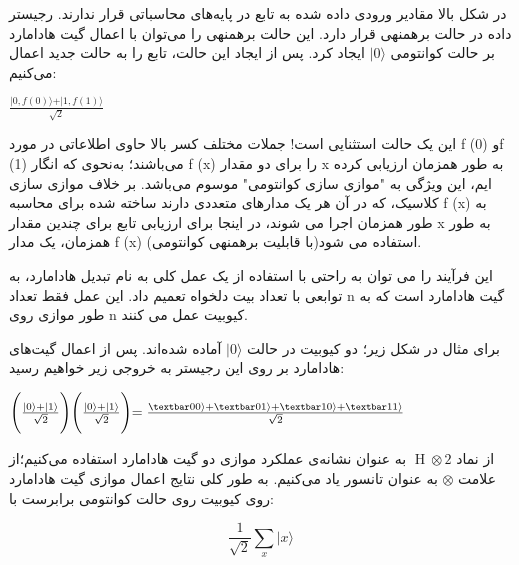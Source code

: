 \documentclass{book}
\begin{document}
در شکل بالا مقادیر ورودی داده شده به تابع  در پایه‌های محاسباتی قرار ندارند. رجیستر داده در حالت برهمنهی  قرار دارد. این حالت برهمنهی را می‌توان با اعمال گیت هادامارد بر حالت کوانتومی $\vert 0 \rangle$ ایجاد کرد. پس از ایجاد این حالت، تابع  را به حالت جدید اعمال می‌کنیم:
\begin{center}
	$\frac{\vert 0,f(0) \rangle +\vert 1,f(1) \rangle }{\sqrt{2}}$
\end{center}

این یک حالت استثنایی است! جملات مختلف کسر بالا حاوی اطلاعاتی در مورد f (0) وf (1) می‌باشند؛ به‌نحوی که انگار f (x) را برای دو مقدار x به طور همزمان ارزیابی کرده ایم، این ویژگی به "موازی  سازی کوانتومی" موسوم می‌باشد. بر خلاف موازی سازی کلاسیک، که در آن هر یک مدارهای متعددی دارند ساخته شده برای محاسبه f (x) به طور همزمان اجرا می شوند، در اینجا برای ارزیابی تابع برای چندین مقدار x به طور همزمان، یک مدار f (x) (با قابلیت برهمنهی کوانتومی)استفاده می شود.

این فرآیند را می توان به راحتی  با استفاده از یک عمل کلی به نام تبدیل هادامارد، به توابعی با تعداد بیت دلخواه تعمیم داد. این عمل فقط تعداد n گیت هادامارد است که به طور موازی روی n کیوبیت عمل می کنند.

برای مثال در شکل زیر؛ دو کیوبیت در حالت $\vert 0 \rangle$ آماده شده‌‌اند. پس از اعمال گیت‌های هادامارد بر روی این رجیستر به خروجی زیر خواهیم رسید: 

\begin{center}
	$ \Biggl( \frac{\vert 0 \rangle + \vert 1 \rangle}{\sqrt{2}}\Biggl)\Biggl( \frac{\vert 0 \rangle + \vert 1 \rangle}{\sqrt{2}}\Biggl) = \frac{\textbar00\rangle + \textbar01\rangle + \textbar10\rangle + \textbar11\rangle}{\sqrt{2}}$

\end{center}

از نماد $\operatorname{H} \otimes 2$ به عنوان نشانه‌ی عملکرد موازی دو گیت هادامارد استفاده می‌کنیم؛از علامت $\otimes$ به عنوان تانسور یاد می‌کنیم. به طور کلی نتایج اعمال موازی گیت هادامارد روی  کیوبیت روی حالت کوانتومی برابرست با:

\begin{center}
	\[\frac{1}{\sqrt{2}} \sum_{x} \vert x \rangle\]
\end{center}
\end{document}

